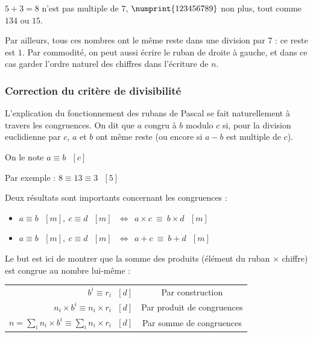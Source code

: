 \documentclass[a4paper]{article}
\begin{document}
$5 + 3 = 8$ n'est pas multiple de $7$, $\numprint{123456789}$ non plus, tout comme $134$ ou $15$.

\vspace{2mm}

Par ailleurs, tous ces nombres ont le même reste dans une division par $7$ : ce reste est $1$. 
Par commodité, on peut aussi écrire le ruban de droite à gauche, et dans ce cas garder l'ordre naturel des chiffres dans l'écriture de $n$.\\

\vfill



\subsubsection*{Correction du critère de divisibilité}\label{ruban_correction}

	L'explication du fonctionnement des rubans de Pascal se fait naturellement à travers les congruences. On dit que $a$ congru à $b$ modulo $c$ si, pour la division euclidienne par $c$, $a$ et $b$ ont même reste (ou encore si $a - b$ est multiple de $c$).
	
\vspace{2 mm}
	
	On le note $a \equiv b ~~~ [c]$
	
\vspace{2 mm}
	
	Par exemple : $8 \equiv 13 \equiv 3 ~~~ [5]$
	
\vspace{2 mm}
	 
	Deux résultats sont importants concernant les congruences :

\begin{itemize}
	\item[] $a \equiv b ~~~ [m], ~ c \equiv d ~~~ [m] ~~~ \Longleftrightarrow ~~ a \times c ~ \equiv ~ b \times d ~~~ [m]$
    \item[] $a \equiv b ~~~ [m], ~ c \equiv d ~~~ [m] ~~~ \Longleftrightarrow ~~ a + c ~ \equiv ~ b + d ~~~ [m]$
\end{itemize}	

\vspace{2 mm}

	Le but est ici de montrer que la somme des produits (élément du ruban $\times$ chiffre) est congrue au nombre lui-même : 
	
\begin{tabular}{rc}

$b^i \equiv r_i ~~~ [d]$ & Par construction\\
$n_i \times b^i \equiv n_i \times r_i ~~~ [d]$ & Par produit de congruences\\
$n = \sum\limits_i n_i \times b^i \equiv \sum\limits_i n_i \times r_i ~~~ [d]$ & Par somme de congruences\\

\end{tabular}
\end{document}
